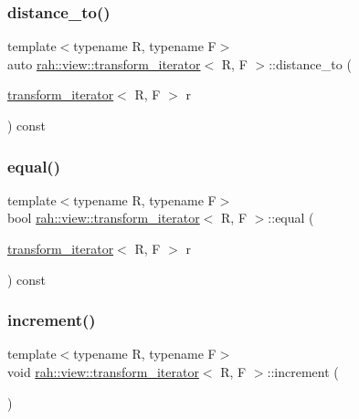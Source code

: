 \subsubsection{\texorpdfstring{distance\_to()}{distance\_to()}}
{\footnotesize\ttfamily template$<$typename R, typename F$>$ \\
auto \mbox{\hyperlink{structrah_1_1view_1_1transform__iterator}{rah\+::view\+::transform\+\_\+iterator}}$<$ R, F $>$\+::distance\+\_\+to (\begin{DoxyParamCaption}\item[{\mbox{\hyperlink{structrah_1_1view_1_1transform__iterator}{transform\+\_\+iterator}}$<$ R, F $>$}]{r }\end{DoxyParamCaption}) const\hspace{0.3cm}{\ttfamily [inline]}}

\mbox{\label{structrah_1_1view_1_1transform__iterator_a68105373ae5ce99863589e17605f3833}} 
\subsubsection{\texorpdfstring{equal()}{equal()}}
{\footnotesize\ttfamily template$<$typename R, typename F$>$ \\
bool \mbox{\hyperlink{structrah_1_1view_1_1transform__iterator}{rah\+::view\+::transform\+\_\+iterator}}$<$ R, F $>$\+::equal (\begin{DoxyParamCaption}\item[{\mbox{\hyperlink{structrah_1_1view_1_1transform__iterator}{transform\+\_\+iterator}}$<$ R, F $>$}]{r }\end{DoxyParamCaption}) const\hspace{0.3cm}{\ttfamily [inline]}}

\mbox{\label{structrah_1_1view_1_1transform__iterator_a1ee5c30f733b63b1cd26baa121389dd1}} 
\subsubsection{\texorpdfstring{increment()}{increment()}}
{\footnotesize\ttfamily template$<$typename R, typename F$>$ \\
void \mbox{\hyperlink{structrah_1_1view_1_1transform__iterator}{rah\+::view\+::transform\+\_\+iterator}}$<$ R, F $>$\+::increment (\begin{DoxyParamCaption}{ }\end{DoxyParamCaption})\hspace{0.3cm}{\ttfamily [inline]}}

